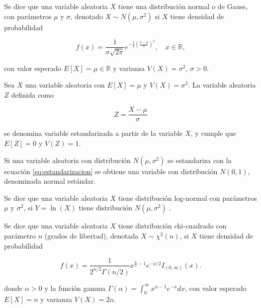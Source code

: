 \begin{definition}
	Se dice que una variable aleatoria $X$ tiene una distribución normal o de Gauss, con parámetros $\mu$ y $\sigma$, denotado $X \sim N(\mu,\sigma^2)$ si $X$ tiene densidad de probabilidad 
	
	\begin{equation}
		\label{eq:normal_distribution}
		f(x) = \frac{1}{\sigma \sqrt{2\pi}} e^{-\frac{1}{2}\left(\frac{x-\mu}{\sigma}\right)^2}, \quad x \in \mathbb{R},
	\end{equation}
	
	con valor esperado $E[X]=\mu \in \mathbb{R}$ y varianza $V(X)=\sigma^2$, $\sigma>0$. \cite{mann2010}  
\end{definition}

\begin{definition}[Estandarización]
	Sea $X$ una variable aleatoria con $E[X]=\mu$ y $V(X)=\sigma^2$. La variable aleatoria $Z$ definida como
	
	\begin{equation}
		\label{eq:estandarizacion}
		Z = \frac{X - \mu}{\sigma}
	\end{equation}
	
	se denomina variable estandarizada a partir de la variable $X$, y cumple que $E[Z]=0$ y $V(Z)=1$.  \cite{mann2010}
\end{definition}

Si una variable aleatoria con distribución $N(\mu,\sigma^2)$ se estandariza con la ecuación \ref{eq:estandarizacion} se obtiene una variable con distribución $N(0,1)$, denominada normal estándar.

\begin{definition}
	Se dice que una variable aleatoria $X$ tiene distribución log-normal con parámetros $\mu$ y $\sigma^2$, si $Y=\ln(X)$ tiene distribución $N(\mu,\sigma^2)$ . \cite{mann2010, nauta2020}
\end{definition}

\begin{definition}  
	Se dice que una variable aleatoria $X$ tiene distribución chi-cuadrado con parámetro $n$ (grados de libertad), denotada $X \sim \chi^2(n)$, si $X$ tiene densidad de probabilidad
	
	\begin{equation}
		\label{eq:chi}
		f(x) = \frac{1}{2^{n/2}\Gamma(n/2)} x^{\frac{n}{2}-1} e^{-x/2} I_{(0,\infty)}(x). \tag{1.2}
	\end{equation}
	
	donde $\alpha>0$ y la función gamma $\Gamma(\alpha)=\int_{0}^{\infty} x^{\alpha-1} e^{-x} dx$, con valor esperado $E[X]=n$ y varianza $V(X)=2n$. \cite{mann2010}
\end{definition}

